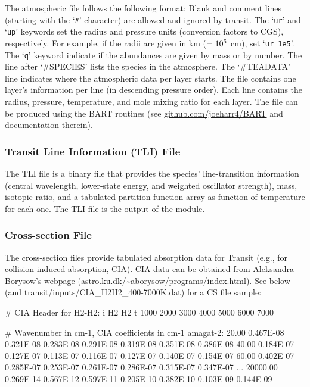 \documentclass[letterpaper, 12pt]{article}
\begin{document}
The atmospheric file follows the following format: Blank and comment
lines (starting with the `{\tt \#}' character) are allowed and ignored
by transit.  The `{\tt ur}' and `{\tt up}' keywords set the radius and
pressure units (conversion factors to CGS), respectively.  For
example, if the radii are given in km ($=10\sp{5}$ cm), set `{\tt ur
  1e5}'.  The `{\tt q}' keyword indicate if the abundances are given
by mass or by number.  The line after `{\tttm\#SPECIES}' lists the
species in the atmosphere.  The `{\tttm\#TEADATA}' line indicates where the
atmospheric data per layer starts.  The file contains one layer's information
per line (in descending pressure order).  Each line contains the
radius, pressure, temperature, and mole mixing ratio for each layer.
The file can be produced using the BART routines (see
\href{https://github.com/joeharr4/BART}{github.com/joeharr4/BART} and
documentation therein).

\subsubsection{Transit Line Information (TLI) File}
\label{sec:TLItransit}

The TLI file is a binary file that provides the species'
line-transition information (central wavelength, lower-state energy,
and weighted oscillator strength), mass, isotopic ratio, and a
tabulated partition-function array as function of temperature for each
one.  The TLI file is the output of the {\pylineread} module.

\subsubsection{Cross-section File}

The cross-section files provide tabulated absorption data for
Transit (e.g., for collision-induced absorption, CIA).  CIA data can be obtained from Aleksandra Borysow's webpage
(\href{http://www.astro.ku.dk/~aborysow/programs/index.html}
{astro.ku.dk/{\sim}aborysow/programs/index.html}).
See below (and {\tttm
  transit/inputs/CIA\_H2H2\_400-7000K.dat}) for a CS file sample:
\newline
\begin{plain}
# CIA Header for H2-H2:
i H2 H2
t         1000      2000      3000      4000      5000      6000      7000

# Wavenumber in cm-1, CIA coefficients in cm-1 amagat-2:
   20.00  0.467E-08 0.321E-08 0.283E-08 0.291E-08 0.319E-08 0.351E-08 0.386E-08
   40.00  0.184E-07 0.127E-07 0.113E-07 0.116E-07 0.127E-07 0.140E-07 0.154E-07
   60.00  0.402E-07 0.285E-07 0.253E-07 0.261E-07 0.286E-07 0.315E-07 0.347E-07
     ...
20000.00  0.269E-14 0.567E-12 0.597E-11 0.205E-10 0.382E-10 0.103E-09 0.144E-09
\end{plain}
\end{document}
